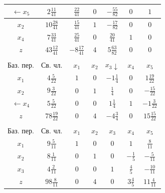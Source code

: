 \documentclass[a4paper,14pt]{extarticle}
\begin{document}
\begin{center}
\begin{tabular}{|c|c|c|c|c|c|c|}
        $\leftarrow x_5$ & $2\frac{11}{41}$  & $\frac{22}{41}$   & $0$   & $-\frac{55}{82}$ & $0$              & $1$               \\
        \hline
        $x_2$            & $10\frac{28}{41}$ & $\frac{15}{41}$   & $1$   & $-\frac{17}{82}$ & $0$              & $0$               \\
        \hline
        $x_4$            & $7\frac{33}{41}$  & $\frac{25}{41}$   & $0$   & $\frac{20}{41}$  & $1$              & $0$               \\
        \hline
        $z$              & $43\frac{12}{41}$ & $-8\frac{17}{41}$ & $4$   & $5\frac{63}{82}$ & $0$              & $0$               \\
        \hline
        \multicolumn{7}{c}{}                                                                                                       \\
        \hline
        Баз. пер.        & Св. чл.           & $x_1$             & $x_2$ & $x_3 \downarrow$ & $x_4 $           & $x_5$             \\
        \hline
        $x_1$            & $4\frac{5}{22}$   & $1$               & $0$   & $-1\frac{1}{4}$  & $0$              & $1\frac{19}{22}$  \\
        \hline
        $x_2$            & $9\frac{3}{22}$   & $0$               & $1$   & $\frac{1}{4}$    & $0$              & $-\frac{15}{22}$  \\
        \hline
        $\leftarrow x_4$ & $5\frac{5}{22}$   & $0$               & $0$   & $1\frac{1}{4}$   & $1$              & $-1\frac{3}{22}$  \\
        \hline
        $z$              & $78\frac{19}{22}$ & $0$               & $4$   & $-4\frac{3}{4}$  & $0$              & $15\frac{15}{22}$ \\
        \hline
        \multicolumn{7}{c}{}                                                                                                       \\
        \hline
        Баз. пер.        & Св. чл.           & $x_1$             & $x_2$ & $x_3$            & $x_4 $           & $x_5$             \\
        \hline
        $x_1$            & $9\frac{5}{11}$   & $1$               & $0$   & $0$              & $1$              & $\frac{8}{11}$    \\
        \hline
        $x_2$            & $8\frac{1}{11}$   & $0$               & $1$   & $0$              & $-\frac{1}{5}$   & $-\frac{5}{11}$   \\
        \hline
        $x_3$            & $4\frac{2}{11}$   & $0$               & $0$   & $1$              & $\frac{4}{5}$    & $-\frac{10}{11}$  \\
        \hline
        $z$              & $98\frac{8}{11}$  & $0$               & $4$   & $0$              & $3\frac{4}{5}$   & $11\frac{4}{11}$  \\
        \hline
    \end{tabular}
\end{center}
\end{document}
